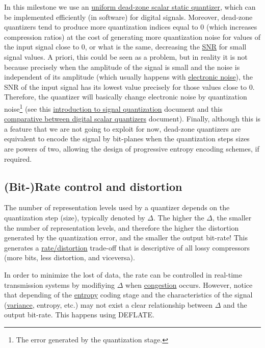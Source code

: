 In this milestone we use an
\href{https://en.wikipedia.org/wiki/Quantization_(signal_processing)#Dead-zone_quantizers}{uniform
  dead-zone scalar static quantizer}, which can be implemented
efficiently (in software) for digital signals. Moreover, dead-zone
quantizers tend to produce more quantization indices equal to 0 (which
increases compression ratios) at the cost of generating more
quantization noise for values of the input signal close to 0, or what
is the same, decreasing the
\href{https://en.wikipedia.org/wiki/Signal-to-noise_ratio}{SNR} for
small signal values. A priori, this could be seen as a problem, but in
reality it is not because precisely when the amplitude of the signal
is small and the noise is independent of its amplitude (which usually
happens with
\href{https://en.wikipedia.org/wiki/Noise_(electronics)}{electronic
  noise}), the SNR of the input signal has its lowest value precisely
for those values close to 0. Therefore, the quantizer will basically
change electronic noise by quantization noise\footnote{The error
  generated by the quantization stage.} (see this
\href{https://github.com/vicente-gonzalez-ruiz/signal_quantization}{introduction
  to signal quantization} document and this
\href{https://github.com/vicente-gonzalez-ruiz/scalar_quantization}{comparative
  between digital scalar quantizers} document). Finally, although this
is a feature that we are not going to exploit for now, dead-zone
quantizers are equivalent to encode the signal by bit-planes when the
quantization steps sizes are powers of two, allowing the design of
progressive entropy encoding schemes, if required.


\subsection{(Bit-)Rate control and distortion}
The number of representation levels used by a quantizer depends on the
quantization step (size), typically denoted by $\Delta$. The higher
the $\Delta$, the smaller the number of representation levels, and
therefore the higher the distortion generated by the quantization
error, and the smaller the output bit-rate! This generates a
\href{https://en.wikipedia.org/wiki/Rate%E2%80%93distortion_theory}{rate/distortion}
  trade-off that is descriptive of all lossy compressors (more bits,
  less distortion, and viceversa).

  In order to minimize the lost of data, the rate can be controlled in
  real-time transmission systems by modifiying $\Delta$ when
  \href{https://en.wikipedia.org/wiki/Network_congestion}{congestion}
  occurs. However, notice that depending of the
  \href{https://en.wikipedia.org/wiki/Entropy_(information_theory)}{entropy}
  coding stage and the characteristics of the signal
  (\href{https://en.wikipedia.org/wiki/Variance}{variance}, entropy,
  etc.) may not exist a clear relationship between $\Delta$ and the
  output bit-rate. This happens using DEFLATE.

